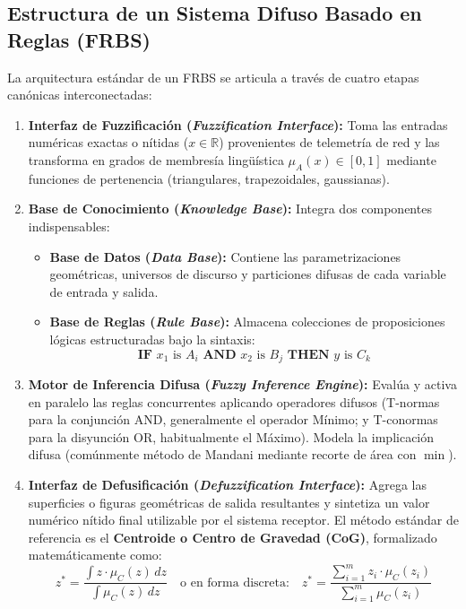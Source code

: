 \documentclass[12pt,a4paper]{article}
\begin{document}
\subsection*{Estructura de un Sistema Difuso Basado en Reglas (FRBS)}
La arquitectura estándar de un FRBS se articula a través de cuatro etapas canónicas interconectadas:
\begin{enumerate}
    \item \textbf{Interfaz de Fuzzificación (\textit{Fuzzification Interface}):} Toma las entradas numéricas exactas o nítidas ($x \in \mathbb{R}$) provenientes de telemetría de red y las transforma en grados de membresía lingüística $\mu_A(x) \in [0, 1]$ mediante funciones de pertenencia (triangulares, trapezoidales, gaussianas).
    \item \textbf{Base de Conocimiento (\textit{Knowledge Base}):} Integra dos componentes indispensables:
    \begin{itemize}
        \item \textbf{Base de Datos (\textit{Data Base}):} Contiene las parametrizaciones geométricas, universos de discurso y particiones difusas de cada variable de entrada y salida.
        \item \textbf{Base de Reglas (\textit{Rule Base}):} Almacena colecciones de proposiciones lógicas estructuradas bajo la sintaxis:
        \begin{equation}
            \textbf{IF } x_1 \text{ is } A_i \textbf{ AND } x_2 \text{ is } B_j \textbf{ THEN } y \text{ is } C_k
        \end{equation}
    \end{itemize}
    \item \textbf{Motor de Inferencia Difusa (\textit{Fuzzy Inference Engine}):} Evalúa y activa en paralelo las reglas concurrentes aplicando operadores difusos (T-normas para la conjunción AND, generalmente el operador Mínimo; y T-conormas para la disyunción OR, habitualmente el Máximo). Modela la implicación difusa (comúnmente método de Mandani mediante recorte de área con $\min$).
    \item \textbf{Interfaz de Defusificación (\textit{Defuzzification Interface}):} Agrega las superficies o figuras geométricas de salida resultantes y sintetiza un valor numérico nítido final utilizable por el sistema receptor. El método estándar de referencia es el \textbf{Centroide o Centro de Gravedad (CoG)}, formalizado matemáticamente como:
    \begin{equation}
        z^* = \frac{\int z \cdot \mu_C(z) \, dz}{\int \mu_C(z) \, dz} \quad \text{o en forma discreta:} \quad z^* = \frac{\sum_{i=1}^m z_i \cdot \mu_C(z_i)}{\sum_{i=1}^m \mu_C(z_i)}
    \end{equation}
\end{enumerate}
\end{document}
